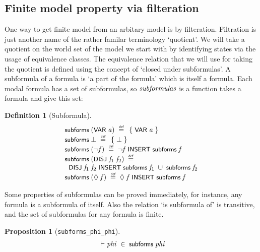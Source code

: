 \documentclass[letterpaper]{article}
\newtheorem{defn}{Definition}
\newtheorem{prop}{Proposition}
\renewcommand{\HOLConst}[1]{{\textsf{\upshape\small #1}}}
\renewcommand{\HOLinline}[1]{\ensuremath{#1}}
\newenvironment{holmath}{\begin{displaymath}\begin{array}{l}}{\end{array}\end{displaymath}\ignorespacesafterend}
\begin{document}
\subsection{Finite model property via filteration}

One way to get finite model from an arbitary model is by filteration. Filtration is just another name of the rather familar terminology `quotient'. We will take a quotient on the world set of the model we start with by identifying states via the usage of equivalence classes. The equivalence relation that we will use for taking the quotient is defined using the concept of `closed under subformulas'. A subformula of a formula is `a part of the formula' which is itself a formula. Each modal formula has a set of subformulas, so \HOLinline{\HOLFreeVar{subformulas}} is a function takes a formula and give this set:
\begin{defn}[Subformula]
\begin{holmath}
  \HOLConst{subforms}\;(\HOLConst{VAR}\;\HOLFreeVar{a})\;\HOLSymConst{\HOLTokenDefEquality{}}\;\HOLTokenLeftbrace{}\HOLConst{VAR}\;\HOLFreeVar{a}\HOLTokenRightbrace{}\\
\HOLConst{subforms}\;\HOLSymConst{\ensuremath{\bot}}\;\HOLSymConst{\HOLTokenDefEquality{}}\;\HOLTokenLeftbrace{}\HOLSymConst{\ensuremath{\bot}}\HOLTokenRightbrace{}\\
\HOLConst{subforms}\;(\HOLSymConst{\HOLTokenNeg{}}\HOLFreeVar{f})\;\HOLSymConst{\HOLTokenDefEquality{}}\;\HOLSymConst{\HOLTokenNeg{}}\HOLFreeVar{f}\;\HOLConst{INSERT}\;\HOLConst{subforms}\;\HOLFreeVar{f}\\
\HOLConst{subforms}\;(\HOLConst{DISJ}\;\HOLFreeVar{f\sb{\mathrm{1}}}\;\HOLFreeVar{f\sb{\mathrm{2}}})\;\HOLSymConst{\HOLTokenDefEquality{}}\\
\;\;\HOLConst{DISJ}\;\HOLFreeVar{f\sb{\mathrm{1}}}\;\HOLFreeVar{f\sb{\mathrm{2}}}\;\HOLConst{INSERT}\;\HOLConst{subforms}\;\HOLFreeVar{f\sb{\mathrm{1}}}\;\HOLSymConst{\HOLTokenUnion{}}\;\HOLConst{subforms}\;\HOLFreeVar{f\sb{\mathrm{2}}}\\
\HOLConst{subforms}\;(\HOLSymConst{\ensuremath{\Diamond}}\;\HOLFreeVar{f})\;\HOLSymConst{\HOLTokenDefEquality{}}\;\HOLSymConst{\ensuremath{\Diamond}}\;\HOLFreeVar{f}\;\HOLConst{INSERT}\;\HOLConst{subforms}\;\HOLFreeVar{f}
\end{holmath}
\end{defn}
 Some properties of subformulas can be proved immediately, for instance, any formula is a subformula of itself. Also the relation `is subformula of' is transitive, and the set of subformulas for any formula is finite. 
\begin{prop}[\texttt{subforms_phi_phi}]
\begin{holmath}
  \ensuremath{\HOLTokenTurnstile}\HOLFreeVar{phi}\;\HOLSymConst{\HOLTokenIn{}}\;\HOLConst{subforms}\;\HOLFreeVar{phi}
\end{holmath}
\end{prop}
\end{document}
